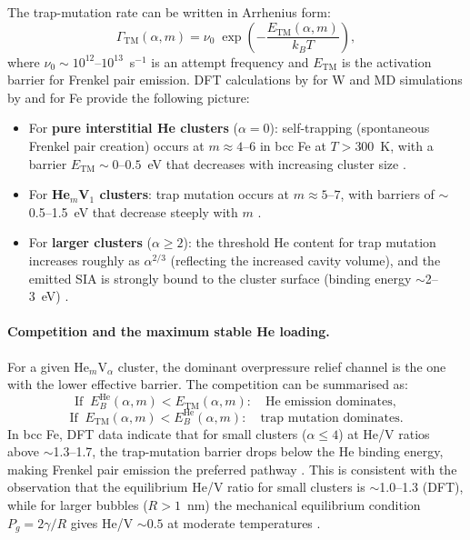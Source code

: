 \documentclass[pdflatex,sn-basic]{sn-jnl} %
\begin{document}
The trap-mutation rate can be written in Arrhenius form:
\begin{equation}\label{eq:Gamma_TM}
    \boxed{\Gamma_{\mathrm{TM}}(\alpha,m)
    = \nu_0\;\exp\!\left(-\frac{E_{\mathrm{TM}}(\alpha,m)}{k_BT}\right),}
\end{equation}
where $\nu_0 \sim 10^{12}$--$10^{13}$~s$^{-1}$ is an attempt frequency
and $E_{\mathrm{TM}}$ is the activation barrier for Frenkel pair emission.
DFT calculations by \citet{Becquart2014_TM} for W and MD simulations by
\citet{Morishita2003} and \citet{Gao2011_HeFe} for Fe provide the following
picture:
\begin{itemize}
    \item For \textbf{pure interstitial He clusters} ($\alpha = 0$):
    self-trapping (spontaneous Frenkel pair creation) occurs at $m \approx
    4$--$6$ in bcc Fe at $T > 300$~K, with a barrier $E_{\mathrm{TM}} \sim
    0$--$0.5$~eV that decreases with increasing cluster size
    \citep{Gao2011_HeFe}.
    
    \item For \textbf{He$_m$V$_1$ clusters}: trap mutation occurs at $m
    \approx 5$--$7$, with barriers of $\sim$0.5--1.5~eV that decrease
    steeply with $m$ \citep{Morishita2003,Fu2007HeDefects}.
    
    \item For \textbf{larger clusters} ($\alpha \geq 2$): the threshold He
    content for trap mutation increases roughly as $\alpha^{2/3}$ (reflecting
    the increased cavity volume), and the emitted SIA is strongly bound to
    the cluster surface (binding energy $\sim$2--3~eV)
    \citep{Becquart2014_TM}.
\end{itemize}

\paragraph{Competition and the maximum stable He loading.}

For a given He$_m$V$_\alpha$ cluster, the dominant overpressure relief channel
is the one with the lower effective barrier. The competition can be summarised
as:
\begin{equation}\label{eq:competition}
    \text{If}\;\;
    E_B^{\mathrm{He}}(\alpha,m) < E_{\mathrm{TM}}(\alpha,m):
    \quad\text{He emission dominates},
\end{equation}
\begin{equation}
    \text{If}\;\;
    E_{\mathrm{TM}}(\alpha,m) < E_B^{\mathrm{He}}(\alpha,m):
    \quad\text{trap mutation dominates}.
\end{equation}
In bcc Fe, DFT data indicate that for small clusters ($\alpha \leq 4$) at He/V
ratios above $\sim$1.3--1.7, the trap-mutation barrier drops below the He
binding energy, making Frenkel pair emission the preferred pathway
\citep{Fu2005He,Morishita2003}. This is consistent with the observation that
the equilibrium He/V ratio for small clusters is $\sim$1.0--1.3 (DFT), while
for larger bubbles ($R > 1$~nm) the mechanical equilibrium condition
$P_g = 2\gamma/R$ gives He/V $\sim 0.5$ at moderate temperatures
\citep{Trinkaus2003}.
\end{document}
